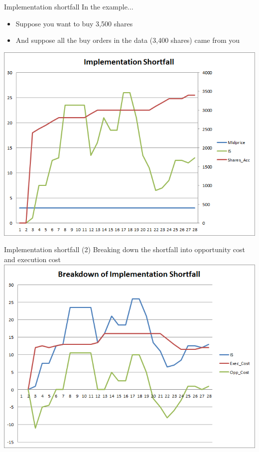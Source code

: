 \documentclass[english,10pt
,aspectratio=169
]{beamer}
\begin{document}
\begin{frame}{Implementation shortfall}
	In the example... 
	\begin{itemize}
		\item Suppose you want to buy 3,500 shares
		\item And suppose all the buy orders in the data (3,400 shares) came from you
	\end{itemize}
	\center
	\includegraphics[scale=0.39]{pics/L2_is}
\end{frame}


\begin{frame}{Implementation shortfall (2)}
	Breaking down the shortfall into opportunity cost and execution cost
	\center
	\includegraphics[scale=0.39]{pics/L2_is2}
\end{frame}
\end{document}
